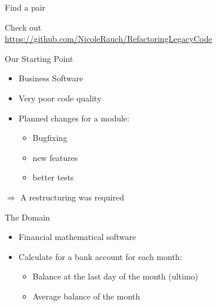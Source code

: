 
\begin{frame}[fragile]{}

\begin{center}
\Huge
Find a pair
\vspace{2em}

Check out \\
\vspace{1em}
\large
\url{https://github.com/NicoleRauch/RefactoringLegacyCode}
\end{center}

\end{frame}

\begin{frame}[fragile]{Our Starting Point}
\begin{itemize}
\item Business Software
\item Very poor code quality
\item Planned changes for a module:
\begin{itemize}
\item Bugfixing
\item new features
\item better tests
\end{itemize}
\end{itemize}

$\Rightarrow$ A restructuring was required
\end{frame}

\begin{frame}[fragile]{The Domain}
\begin{itemize}
\item Financial mathematical software
\end{itemize}

\begin{itemize}
\item Calculate for a bank account for each month:
\begin{itemize}
\item Balance at the last day of the month (ultimo)
\item Average balance of the month
\end{itemize}
\end{itemize}

\end{frame}


